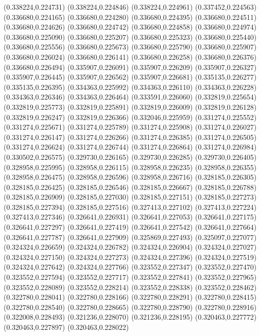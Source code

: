(0.338224,0.224731)
(0.338224,0.224846)
(0.338224,0.224961)
(0.337452,0.224563)
(0.336680,0.224165)
(0.336680,0.224280)
(0.336680,0.224395)
(0.336680,0.224511)
(0.336680,0.224626)
(0.336680,0.224742)
(0.336680,0.224858)
(0.336680,0.224974)
(0.336680,0.225090)
(0.336680,0.225207)
(0.336680,0.225323)
(0.336680,0.225440)
(0.336680,0.225556)
(0.336680,0.225673)
(0.336680,0.225790)
(0.336680,0.225907)
(0.336680,0.226024)
(0.336680,0.226141)
(0.336680,0.226258)
(0.336680,0.226376)
(0.336680,0.226494)
(0.335907,0.226091)
(0.335907,0.226209)
(0.335907,0.226327)
(0.335907,0.226445)
(0.335907,0.226562)
(0.335907,0.226681)
(0.335135,0.226277)
(0.335135,0.226395)
(0.334363,0.225992)
(0.334363,0.226110)
(0.334363,0.226228)
(0.334363,0.226346)
(0.334363,0.226464)
(0.333591,0.226060)
(0.332819,0.225654)
(0.332819,0.225773)
(0.332819,0.225891)
(0.332819,0.226009)
(0.332819,0.226128)
(0.332819,0.226247)
(0.332819,0.226366)
(0.332046,0.225959)
(0.331274,0.225552)
(0.331274,0.225671)
(0.331274,0.225789)
(0.331274,0.225908)
(0.331274,0.226027)
(0.331274,0.226147)
(0.331274,0.226266)
(0.331274,0.226385)
(0.331274,0.226505)
(0.331274,0.226624)
(0.331274,0.226744)
(0.331274,0.226864)
(0.331274,0.226984)
(0.330502,0.226575)
(0.329730,0.226165)
(0.329730,0.226285)
(0.329730,0.226405)
(0.328958,0.225995)
(0.328958,0.226115)
(0.328958,0.226235)
(0.328958,0.226355)
(0.328958,0.226475)
(0.328958,0.226596)
(0.328958,0.226716)
(0.328185,0.226305)
(0.328185,0.226425)
(0.328185,0.226546)
(0.328185,0.226667)
(0.328185,0.226788)
(0.328185,0.226909)
(0.328185,0.227030)
(0.328185,0.227151)
(0.328185,0.227273)
(0.328185,0.227394)
(0.328185,0.227516)
(0.327413,0.227102)
(0.327413,0.227224)
(0.327413,0.227346)
(0.326641,0.226931)
(0.326641,0.227053)
(0.326641,0.227175)
(0.326641,0.227297)
(0.326641,0.227419)
(0.326641,0.227542)
(0.326641,0.227664)
(0.326641,0.227787)
(0.326641,0.227909)
(0.325869,0.227493)
(0.325097,0.227077)
(0.324324,0.226659)
(0.324324,0.226782)
(0.324324,0.226904)
(0.324324,0.227027)
(0.324324,0.227150)
(0.324324,0.227273)
(0.324324,0.227396)
(0.324324,0.227519)
(0.324324,0.227642)
(0.324324,0.227766)
(0.323552,0.227347)
(0.323552,0.227470)
(0.323552,0.227594)
(0.323552,0.227717)
(0.323552,0.227841)
(0.323552,0.227965)
(0.323552,0.228089)
(0.323552,0.228214)
(0.323552,0.228338)
(0.323552,0.228462)
(0.322780,0.228041)
(0.322780,0.228166)
(0.322780,0.228291)
(0.322780,0.228415)
(0.322780,0.228540)
(0.322780,0.228665)
(0.322780,0.228790)
(0.322780,0.228916)
(0.322008,0.228493)
(0.321236,0.228070)
(0.321236,0.228195)
(0.320463,0.227772)
(0.320463,0.227897)
(0.320463,0.228022)
